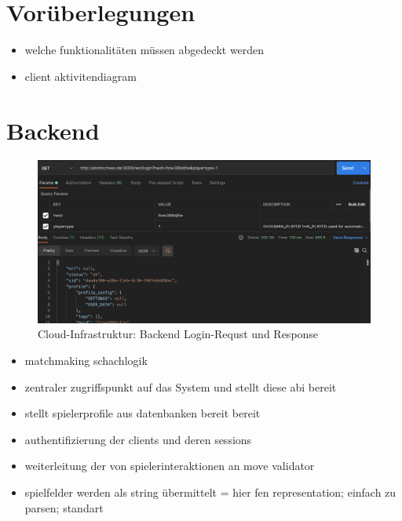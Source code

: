 \hypertarget{voruxfcberlegungen}{%
\section{Vorüberlegungen}\label{voruxfcberlegungen}}

\begin{itemize}
\tightlist
\item
  welche funktionalitäten müssen abgedeckt werden
\item
  client aktivitendiagram
\end{itemize}

\hypertarget{backend}{%
\section{Backend}\label{backend}}

\begin{figure}
\centering
\includegraphics{images/ATC_request_example.png}
\caption{Cloud-Infrastruktur: Backend Login-Requst und Response
\label{ATC_request_example}}
\end{figure}

\begin{itemize}
\tightlist
\item
  matchmaking schachlogik
\item
  zentraler zugriffspunkt auf das System und stellt diese abi bereit
\item
  stellt spielerprofile aus datenbanken bereit bereit
\item
  authentifizierung der clients und deren sessions
\item
  weiterleitung der von spielerinteraktionen an move validator
\item
  spielfelder werden als string übermittelt = hier fen representation;
  einfach zu parsen; standart
\end{itemize}

